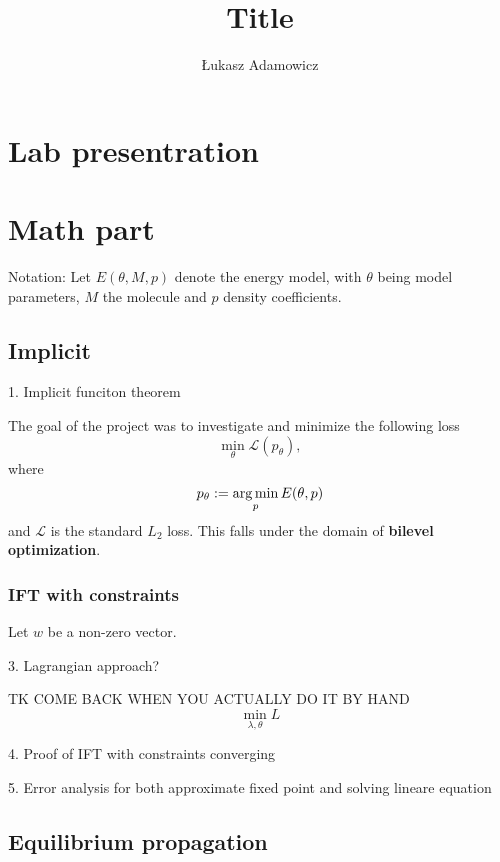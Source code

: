 \documentclass[a4paper,10pt]{report}
\title{Title}
\author{Łukasz Adamowicz}
\begin{document}
\maketitle

\begin{abstract}
\end{abstract}



\section{ Lab presentration}

 \section{Math part}
Notation: Let $E(\theta, M ,p)$ denote the energy model, with $\theta$ being model parameters, $M$ the molecule and $p$ density coefficients.

 \subsection{Implicit}
1. Implicit funciton theorem

The goal of the project was to investigate and minimize the following loss
\begin{equation}
 \min_\theta \mathcal{L}(p_{\theta}),
\end{equation}
where
\begin{equation}
  p_\theta:=\operatorname*{arg\,min}_p E(\theta,p)
\end{equation}
and $\mathcal{L}$ is the standard $L_2$ loss.
This falls under the domain of \textbf{bilevel optimization}.

\subsubsection{ IFT with constraints}
Let $w$ be a non-zero vector.

3. Lagrangian approach?

TK COME BACK WHEN YOU ACTUALLY DO IT BY HAND
 \begin{equation}
\min_{\lambda,\theta} L
 \end{equation}

4. Proof of IFT with constraints converging

5. Error analysis for both approximate fixed point and solving lineare equation
\subsection{ Equilibrium propagation}
\end{document}
